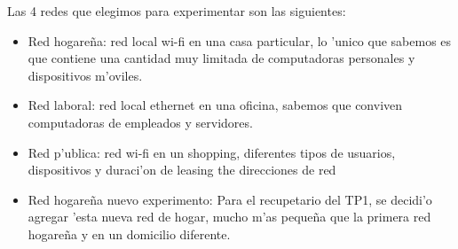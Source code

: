Las 4 redes que elegimos para experimentar son las siguientes:
\begin{itemize}
	\item Red hogare\~na: red local wi-fi en una casa particular, lo 'unico que sabemos es que contiene una cantidad muy
	 limitada de computadoras personales y dispositivos m'oviles.
	\item Red laboral: red local ethernet en una oficina, sabemos que conviven computadoras de empleados y servidores.
	\item Red p'ublica: red wi-fi en un shopping, diferentes tipos de usuarios, dispositivos y duraci'on de leasing the direcciones de red
	\item Red hogare\~na nuevo experimento: Para el recupetario del TP1, se decidi'o agregar 'esta nueva red de hogar, mucho m'as 
		peque\~na que la primera red hogare\~na y en un domicilio diferente. 
\end{itemize}
